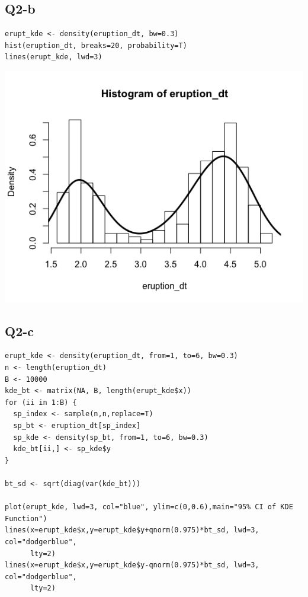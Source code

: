 \documentclass[12pt,letterpaper]{article}
\begin{document}
\subsection*{Q2-b}
\begin{verbatim}
erupt_kde <- density(eruption_dt, bw=0.3)
hist(eruption_dt, breaks=20, probability=T)
lines(erupt_kde, lwd=3)
\end{verbatim}

\includegraphics[scale=0.7]{q2-b.png}

\subsection*{Q2-c}
\begin{verbatim}
erupt_kde <- density(eruption_dt, from=1, to=6, bw=0.3)
n <- length(eruption_dt)
B <- 10000
kde_bt <- matrix(NA, B, length(erupt_kde$x))
for (ii in 1:B) {
  sp_index <- sample(n,n,replace=T)
  sp_bt <- eruption_dt[sp_index]
  sp_kde <- density(sp_bt, from=1, to=6, bw=0.3)
  kde_bt[ii,] <- sp_kde$y
}

bt_sd <- sqrt(diag(var(kde_bt)))

plot(erupt_kde, lwd=3, col="blue", ylim=c(0,0.6),main="95% CI of KDE Function")
lines(x=erupt_kde$x,y=erupt_kde$y+qnorm(0.975)*bt_sd, lwd=3, col="dodgerblue",
      lty=2)
lines(x=erupt_kde$x,y=erupt_kde$y-qnorm(0.975)*bt_sd, lwd=3, col="dodgerblue",
      lty=2)
\end{verbatim}
\end{document}
